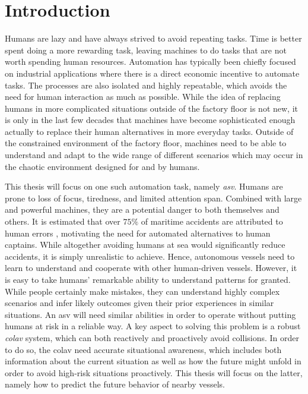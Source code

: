 \chapter{Introduction}
Humans are lazy and have always strived to avoid repeating tasks. Time is better spent doing a more rewarding task, leaving machines to do tasks that are not worth spending human resources. Automation has typically been chiefly focused on industrial applications where there is a direct economic incentive to automate tasks. The processes are also isolated and highly repeatable, which avoids the need for human interaction as much as possible. While the idea of replacing humans in more complicated situations outside of the factory floor is not new, it is only in the last few decades that machines have become sophisticated enough actually to replace their human alternatives in more everyday tasks. Outside of the constrained environment of the factory floor, machines need to be able to understand and adapt to the wide range of different scenarios which may occur in the chaotic environment designed for and by humans. 

This thesis will focus on one such automation task, namely \textit{\acrfull{asv}}. Humans are prone to loss of focus, tiredness, and limited attention span. Combined with large and powerful machines, they are a potential danger to both themselves and others. It is estimated that over $75\%$ of maritime accidents are attributed to human errors \cite{Tengesdal2020RiskbasedAM}, motivating the need for automated alternatives to human captains. While altogether avoiding humans at sea would significantly reduce accidents, it is simply unrealistic to achieve. Hence, autonomous vessels need to learn to understand and cooperate with other human-driven vessels. However, it is easy to take humans' remarkable ability to understand patterns for granted. While people certainly make mistakes, they can understand highly complex scenarios and infer likely outcomes given their prior experiences in similar situations. An \acrshort{asv} will need similar abilities in order to operate without putting humans at risk in a reliable way. A key aspect to solving this problem is a robust \textit{\acrfull{colav}} system, which can both reactively and proactively avoid collisions. In order to do so, the \acrshort{colav} need accurate situational awareness, which includes both information about the current situation as well as how the future might unfold in order to avoid high-risk situations proactively. This thesis will focus on the latter, namely how to predict the future behavior of nearby vessels.

